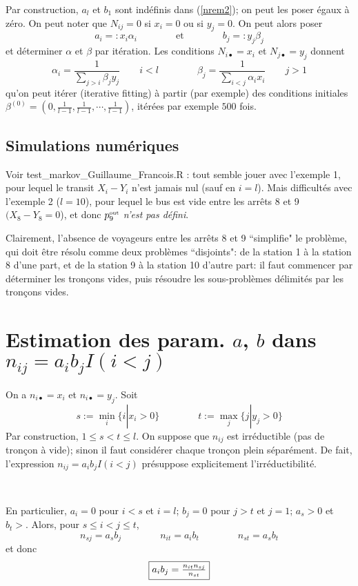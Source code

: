 \documentclass{svmult}
\begin{document}
 Par construction, $a_l$ et $b_1$ sont indéfinis dans  (\ref{nrem2}); on peut les poser égaux à zéro. On peut noter que 
 $N_{ij}=0$ si $x_i=0$ ou si $y_j=0$.  On peut alors poser 
 \begin{displaymath}
a_i=:x_i\alpha_i\qquad\qquad\mbox{et}\qquad\qquad b_j=:y_j\beta_j
\end{displaymath}
et déterminer $\alpha$ et $\beta$ par itération. Les conditions $N_{i\bullet}=x_i$ et $N_{j\bullet}=y_j$ donnent 
\begin{equation}
\label{iterFit}
\alpha_i=\frac{1}{\sum_{j>i}\beta_j y_j}\qquad i<l \qquad\qquad \beta_j =\frac{1}{\sum_{i<j}\alpha_i x_i}\qquad j>1
\end{equation}
qu'on peut itérer (iterative fitting) à partir (par exemple) des conditions initiales $\beta^{(0)}=(0,\frac{1}{l-1},\frac{1}{l-1},\cdots,\frac{1}{l-1})$, itérées par exemple $500$ fois. 


\subsection{Simulations numériques}
 Voir test\_markov\_Guillaume\_Francois.R : tout semble jouer avec l'exemple 1, pour lequel le transit $X_i-Y_i$ n'est jamais nul (sauf en $i=l$). Mais difficultés avec l'exemple 2 ($l=10$), pour lequel le bus est vide entre les arrêts 8 et 9 $(X_8-Y_8=0$), et donc  $p_9^{\mbox{\tiny out}}$ {\em n'est pas défini}.
 
 Clairement, l'absence de voyageurs entre les arrêts 8 et 9 ``simplifie" le problème, qui doit être résolu comme deux problèmes ``disjoints": de la station 1 à la station 8 d'une part, et de la station 9 à la station 10 d'autre part: il faut commencer par déterminer les tronçons vides, puis résoudre les sous-problèmes délimités par les tronçons vides. 
 
 \section{Estimation des param. $a$, $b$ dans $n_{ij}=a_ib_j I(i<j)$}
On a $n_{i\bullet}=x_i$ et $n_{i\bullet }=y_j$. Soit 
\begin{equation}
\label{ }
s:=\min_i \{i | x_i>0\}
\qquad\qquad
t:=\max_j \{j | y_j>0\}
\end{equation}
Par construction, $1\le s<t\le l$. On suppose que $n_{ij}$ est irréductible (pas de tronçon à vide); sinon il faut considérer chaque tronçon plein séparément.  
De fait, l'expression $n_{ij}=a_ib_j I(i<j)$ présuppose explicitement l'irréductibilité. 

\


En particulier, 
$a_i=0$ pour $i<s$ et $i=l$; $b_j=0$ pour $j>t$ et $j=1$; 
$a_s>0$ et $b_t>$. Alors, pour $ s\le i <j\le t$, 
\begin{equation}
\label{ }
n_{sj}=a_sb_j\qquad\qquad n_{it}=a_ib_t\qquad\qquad n_{st}=a_sb_t
\end{equation}
et donc
\begin{equation}
\label{ }
\mbox{\fbox{$a_ib_j=\frac{n_{it}n_{sj}}{n_{st}}$}}
\end{equation}



 
\end{document}
